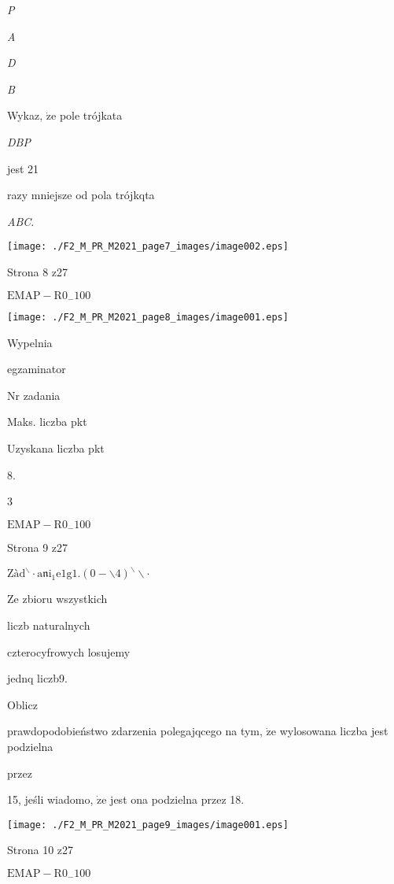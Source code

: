 \documentclass[a4paper,12pt]{article}
\begin{document}
{\it P}

{\it A}

{\it D}

{\it B}

Wykaz, $\dot{\mathrm{z}}\mathrm{e}$ pole trójkata

{\it DBP}

jest 21

razy mniejsze od pola trójkqta

{\it ABC}.
\begin{center}
\texttt{[image: ./F2\_M\_PR\_M2021\_page7\_images/image002.eps]}
\end{center}
Strona 8 z27

$\mathrm{E}\mathrm{M}\mathrm{A}\mathrm{P}-\mathrm{R}0_{-}100$




\begin{center}
\texttt{[image: ./F2\_M\_PR\_M2021\_page8\_images/image001.eps]}
\end{center}
Wypelnia

egzaminator

Nr zadania

Maks. liczba pkt

Uzyskana liczba pkt

8.

3

$\mathrm{E}\mathrm{M}\mathrm{A}\mathrm{P}-\mathrm{R}0_{-}100$

Strona 9 z27





$\mathrm{Z}\text{à} \mathrm{d}^{\backslash }\cdot \mathrm{a}\mathfrak{n}\mathrm{i}_{1}\mathrm{e}1\mathrm{g}1. (0-\backslash 4)^{\backslash }\backslash \cdot$

Ze zbioru wszystkich

liczb naturalnych

czterocyfrowych losujemy

jednq liczb9.

Oblicz

prawdopodobieństwo zdarzenia polegajqcego na tym, $\dot{\mathrm{z}}\mathrm{e}$ wylosowana liczba jest podzielna

przez

15, jeśli wiadomo, $\dot{\mathrm{z}}\mathrm{e}$ jest ona podzielna przez 18.
\begin{center}
\texttt{[image: ./F2\_M\_PR\_M2021\_page9\_images/image001.eps]}
\end{center}
Strona 10 z27

$\mathrm{E}\mathrm{M}\mathrm{A}\mathrm{P}-\mathrm{R}0_{-}100$
\end{document}
